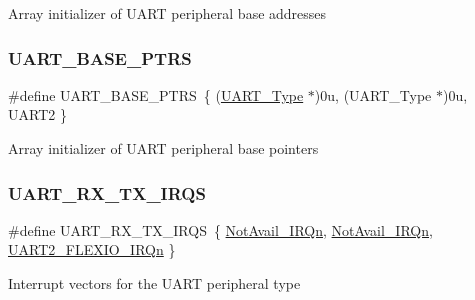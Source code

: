 Array initializer of U\+A\+RT peripheral base addresses \mbox{\label{group___u_a_r_t___peripheral___access___layer_ga7b34a38b9492a1e1007b2f66383aef17}} 
\subsubsection{\texorpdfstring{UART\_BASE\_PTRS}{UART\_BASE\_PTRS}}
{\footnotesize\ttfamily \#define U\+A\+R\+T\+\_\+\+B\+A\+S\+E\+\_\+\+P\+T\+RS~\{ (\mbox{\hyperlink{struct_u_a_r_t___type}{U\+A\+R\+T\+\_\+\+Type}} $\ast$)0u, (\+U\+A\+R\+T\+\_\+\+Type $\ast$)0u, U\+A\+R\+T2 \}}

Array initializer of U\+A\+RT peripheral base pointers \mbox{\label{group___u_a_r_t___peripheral___access___layer_ga84932f7830684ae87059a8343f90095b}} 
\subsubsection{\texorpdfstring{UART\_RX\_TX\_IRQS}{UART\_RX\_TX\_IRQS}}
{\footnotesize\ttfamily \#define U\+A\+R\+T\+\_\+\+R\+X\+\_\+\+T\+X\+\_\+\+I\+R\+QS~\{ \mbox{\hyperlink{group___interrupt__vector__numbers_gga666eb0caeb12ec0e281415592ae89083a1f4ef0294648930fce11a95a3000197d}{Not\+Avail\+\_\+\+I\+R\+Qn}}, \mbox{\hyperlink{group___interrupt__vector__numbers_gga666eb0caeb12ec0e281415592ae89083a1f4ef0294648930fce11a95a3000197d}{Not\+Avail\+\_\+\+I\+R\+Qn}}, \mbox{\hyperlink{group___interrupt__vector__numbers_gga666eb0caeb12ec0e281415592ae89083a5475321bd2bac9aae86ed45895c66b1f}{U\+A\+R\+T2\+\_\+\+F\+L\+E\+X\+I\+O\+\_\+\+I\+R\+Qn}} \}}

Interrupt vectors for the U\+A\+RT peripheral type 